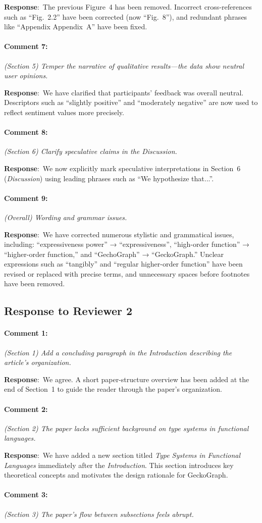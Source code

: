 \documentclass{article}
\newcommand{\pointRaised}[2]{\medskip \noindent 
               \paragraph{#1} \textsl{#2}}
\newcommand{\reply}{\noindent \textbf{Response}:\ }
\begin{document}
\reply The previous Figure~4 has been removed. Incorrect cross-references such as “Fig.~2.2” have been corrected (now “Fig.~8”), and redundant phrases like “Appendix Appendix~A” have been fixed.

\pointRaised{Comment 7:}{(Section 5) Temper the narrative of qualitative results—the data show neutral user opinions.}

\reply We have clarified that participants’ feedback was overall neutral. Descriptors such as “slightly positive” and “moderately negative” are now used to reflect sentiment values more precisely.

\pointRaised{Comment 8:}{(Section 6) Clarify speculative claims in the Discussion.}

\reply We now explicitly mark speculative interpretations in Section~6 (\textit{Discussion}) using leading phrases such as “We hypothesize that...”.

\pointRaised{Comment 9:}{(Overall) Wording and grammar issues.}

\reply We have corrected numerous stylistic and grammatical issues, including:
“expressiveness power” → “expressiveness”,
“high-order function” → “higher-order function,”
and “GechoGraph” → “GeckoGraph.”  
Unclear expressions such as “tangibly” and “regular higher-order function” have been revised or replaced with precise terms, and unnecessary spaces before footnotes have been removed.


\subsection*{Response to Reviewer 2}

\pointRaised{Comment 1:}{(Section 1) Add a concluding paragraph in the Introduction describing the article’s organization.}

\reply We agree. A short paper-structure overview has been added at the end of Section~1 to guide the reader through the paper’s organization.

\pointRaised{Comment 2:}{(Section 2) The paper lacks sufficient background on type systems in functional languages.}

\reply We have added a new section titled \textit{Type Systems in Functional Languages} immediately after the \textit{Introduction}. This section introduces key theoretical concepts and motivates the design rationale for GeckoGraph.

\pointRaised{Comment 3:}{(Section 3) The paper’s flow between subsections feels abrupt.}
\end{document}
